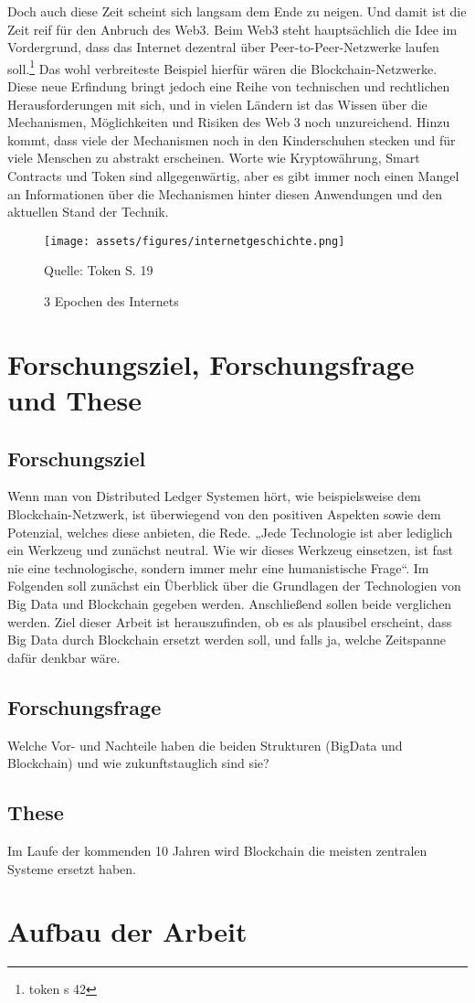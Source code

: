 Doch auch diese Zeit scheint sich langsam dem Ende zu neigen. Und damit ist die Zeit reif für den Anbruch des Web3. Beim Web3 steht hauptsächlich die Idee im Vordergrund, dass das Internet dezentral über Peer-to-Peer-Netzwerke laufen soll.\footnote{token s 42} Das wohl verbreiteste Beispiel hierfür wären die Blockchain-Netzwerke. Diese neue Erfindung bringt jedoch eine Reihe von technischen und rechtlichen Herausforderungen mit sich, und in vielen Ländern ist das Wissen über die Mechanismen, Möglichkeiten und Risiken des Web 3 noch unzureichend. Hinzu kommt, dass viele der Mechanismen noch in den Kinderschuhen stecken und für viele Menschen zu abstrakt erscheinen. Worte wie Kryptowährung, Smart Contracts und Token sind allgegenwärtig, aber es gibt immer noch einen Mangel an Informationen über die Mechanismen hinter diesen Anwendungen und den aktuellen Stand der Technik.

\begin{figure}[!ht]
    \caption{3 Epochen des Internets}
    \texttt{[image: assets/figures/internetgeschichte.png]}
    \begin{flushleft}
        Quelle: Token S. 19
    \end{flushleft}
    \label{fig:birds}
\end{figure}

\section{Forschungsziel, Forschungsfrage und These}
\subsection{Forschungsziel}
Wenn man von Distributed Ledger Systemen hört, wie beispielsweise dem Blockchain-Netzwerk, ist überwiegend von den positiven Aspekten sowie dem Potenzial, welches diese anbieten, die Rede. „Jede Technologie ist aber lediglich ein Werkzeug und zunächst neutral. Wie wir dieses Werkzeug einsetzen, ist fast nie eine technologische, sondern immer mehr eine humanistische Frage“.
Im Folgenden soll zunächst ein Überblick über die Grundlagen der Technologien von Big Data und Blockchain gegeben werden. Anschließend sollen beide verglichen werden. Ziel dieser Arbeit ist herauszufinden, ob es als plausibel erscheint, dass Big Data durch Blockchain ersetzt werden soll, und falls ja, welche Zeitspanne dafür denkbar wäre.
\subsection{Forschungsfrage}
Welche Vor- und Nachteile haben die beiden Strukturen (BigData und Blockchain) und wie zukunftstauglich sind sie?
\subsection{These}
Im Laufe der kommenden 10 Jahren wird Blockchain die meisten zentralen Systeme ersetzt haben.



\section{Aufbau der Arbeit}

